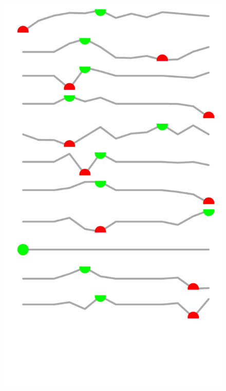 \documentclass{article}\usepackage[]{graphicx}\usepackage[]{color}
\makeatletter
\def\maxwidth{ %
  \ifdim\Gin@nat@width>\linewidth
    \linewidth
  \else
    \Gin@nat@width
  \fi
}
\makeatother
\begin{document}
\begin{figure}
\begin{minipage}[c]{0.95\textwidth}
\begin{minipage}[c]{0.83\textwidth}
{    }
  \end{minipage}
  \begin{minipage}[c]{0.125\textwidth}
    \vspace*{+1.5cm}


{\centering \includegraphics[width=\maxwidth]{figure/sparklines_Culture-1} 

}



    \vspace*{-0.5cm}
  \end{minipage}
  

\end{minipage}
\end{figure}
\end{document}
